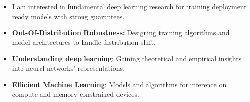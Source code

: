 \begin{itemize}[leftmargin=1.5mm ]
    \item[] I am interested in fundamental deep learning research for training deployment ready models with strong guarantees.
\end{itemize}  
\begin{itemize}
\setlength\itemsep{0.3em}
\vspace*{-2pt}
    \item \textbf{Out-Of-Distribution Robustness:} Designing training algorithms and model architectures to handle distribution shift.
    \item \textbf{Understanding deep learning}: Gaining theoretical and empirical insights into neural networks' representations.
    \item \textbf{Efficient Machine Learning}: Models and algorithms for inference on compute and memory constrained devices.    
\end{itemize}

